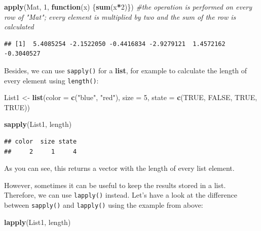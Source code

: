 \documentclass[
]{book}
\newenvironment{Shaded}{\begin{snugshade}}{\end{snugshade}}
\newcommand{\AttributeTok}[1]{\textcolor[rgb]{0.13,0.29,0.53}{#1}}
\newcommand{\CommentTok}[1]{\textcolor[rgb]{0.56,0.35,0.01}{\textit{#1}}}
\newcommand{\ConstantTok}[1]{\textcolor[rgb]{0.56,0.35,0.01}{#1}}
\newcommand{\ControlFlowTok}[1]{\textcolor[rgb]{0.13,0.29,0.53}{\textbf{#1}}}
\newcommand{\DecValTok}[1]{\textcolor[rgb]{0.00,0.00,0.81}{#1}}
\newcommand{\FunctionTok}[1]{\textcolor[rgb]{0.13,0.29,0.53}{\textbf{#1}}}
\newcommand{\NormalTok}[1]{#1}
\newcommand{\OtherTok}[1]{\textcolor[rgb]{0.56,0.35,0.01}{#1}}
\newcommand{\SpecialCharTok}[1]{\textcolor[rgb]{0.81,0.36,0.00}{\textbf{#1}}}
\newcommand{\StringTok}[1]{\textcolor[rgb]{0.31,0.60,0.02}{#1}}
\begin{document}
\begin{Shaded}
\begin{Highlighting}[]
\FunctionTok{apply}\NormalTok{(Mat, }\DecValTok{1}\NormalTok{, }\ControlFlowTok{function}\NormalTok{(x) \{}\FunctionTok{sum}\NormalTok{(x}\SpecialCharTok{*}\DecValTok{2}\NormalTok{)\}) }\CommentTok{\#the operation is performed on every row of "Mat"; every element is multiplied by two and the sum of the row is calculated}
\end{Highlighting}
\end{Shaded}

\begin{verbatim}
## [1]  5.4085254 -2.1522050 -0.4416834 -2.9279121  1.4572162 -0.3040527
\end{verbatim}

Besides, we can use \texttt{sapply()} for a \textbf{list}, for example to calculate the length of every element using \texttt{length()}:

\begin{Shaded}
\begin{Highlighting}[]
\NormalTok{List1 }\OtherTok{\textless{}{-}} \FunctionTok{list}\NormalTok{(}\AttributeTok{color =} \FunctionTok{c}\NormalTok{(}\StringTok{"blue"}\NormalTok{, }\StringTok{"red"}\NormalTok{), }\AttributeTok{size =} \DecValTok{5}\NormalTok{, }\AttributeTok{state =} \FunctionTok{c}\NormalTok{(}\ConstantTok{TRUE}\NormalTok{, }\ConstantTok{FALSE}\NormalTok{, }\ConstantTok{TRUE}\NormalTok{, }\ConstantTok{TRUE}\NormalTok{))}

\FunctionTok{sapply}\NormalTok{(List1, length)}
\end{Highlighting}
\end{Shaded}

\begin{verbatim}
## color  size state 
##     2     1     4
\end{verbatim}

As you can see, this returns a vector with the length of every list element.

However, sometimes it can be useful to keep the results stored in a list.
Therefore, we can use \texttt{lapply()} instead.
Let's have a look at the difference between \texttt{sapply()} and \texttt{lapply()} using the example from above:

\begin{Shaded}
\begin{Highlighting}[]
\FunctionTok{lapply}\NormalTok{(List1, length)}
\end{Highlighting}
\end{Shaded}
\end{document}
